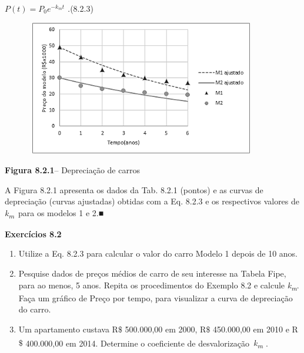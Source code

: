 \documentclass[12pt]{article}
\begin{document}
\vspace{\baselineskip}
 \( P \left( t \right) =P_{0}e^{-k_{m}t} \) \textit{.\tab \tab \tab \tab \tab \tab \tab }(8.2.3)\par


\vspace{\baselineskip}



\begin{figure}[H]
	\begin{Center}
		\includegraphics[width=4.0in,height=2.32in]{./media/image10.png}
	\end{Center}
\end{figure}



\par

\textbf{Figura 8.2.1}– Depreciação de carros\par


\vspace{\baselineskip}
A Figura 8.2.1 apresenta os dados da Tab. 8.2.1 (pontos) e as curvas de depreciação (curvas ajustadas) obtidas com a Eq. 8.2.3 e os respectivos valores de \textit{k\textsubscript{m}}\  para os modelos 1 e 2.■\par


\vspace{\baselineskip}
\textbf{Exercícios 8.2}\par


\vspace{\baselineskip}
\begin{enumerate}
	\item Utilize a Eq. 8.2.3 para calcular o valor do carro Modelo 1 depois de 10 anos.\par

	\item Pesquise dados de preços médios de carro de seu interesse na Tabela Fipe, para ao menos, 5 anos. Repita os procedimentos do Exemplo 8.2 e calcule \textit{k\textsubscript{m}}. Faça um gráfico de Preço por tempo, para visualizar a curva de depreciação do carro.\par

	\item Um apartamento custava R$\$$  500.000,00 em 2000, R$\$$  450.000,00 em 2010 e R$\$$  400.000,00 em 2014. Determine o coeficiente de desvalorização\  \textit{k\textsubscript{m}\textsuperscript{ }}.
\end{enumerate}\par
\end{document}

